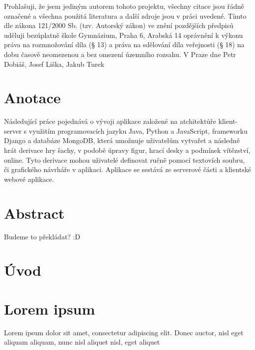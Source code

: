 \documentclass[12pt]{article}
\begin{document}
\graphicspath{{./pictures/}}
\renewcommand*\contentsname{Obsah}
\renewcommand{\bibfont}{\small}
\renewcommand{\thesection}{\Roman{section}} 
\renewcommand{\thesubsection}{\thesection.\Roman{subsection}}
\renewcommand{\thesubsubsection}{\thesubsection.\Roman{subsubsection}}
\renewcommand\listoflistingscaption{Seznam příloh}
\renewcommand{\listingscaption}{Příloha}

\newpage{}
\thispagestyle{empty}
\mbox{}
\vfill
Prohlašuji, že jsem jediným autorem tohoto projektu, všechny citace jsou řádně označené a všechna použitá literatura a další zdroje jsou v práci uvedené. Tímto dle zákona 121/2000 Sb. (tzv. Autorský zákon) ve znění pozdějších předpisů uděluji bezúplatně škole Gymnázium, Praha 6, Arabská 14
oprávnění k výkonu práva na rozmnožování díla (§ 13) a práva na sdělování díla veřejnosti (§ 18) na dobu časově neomezenou a bez omezení územního rozsahu.
\newline
V Praze dne \hfill Petr Dobiáš, Josef Liška, Jakub Turek
\newpage{}
\thispagestyle{empty}
\section*{Anotace}
Následující práce pojednává o vývoji aplikace založené na atchitektůře klient-server s využitím programovacích jazyku Java, Python a JavaScript, frameworku Django a databáze MongoDB, která umožnuje uživatelům vytvařet a následně hrát derivace hry šachy, v podobě úpravy figur, hrací desky a podmínek vítězství, online. Tyto derivace mohou uživatelé definovat ručně pomocí textovích soubru, či grafického návrháře v aplikaci. Aplikace se sestává ze serverové části a klientské webové aplikace.
\section*{Abstract}
Budeme to překládat? :D
\newpage
\setcounter{page}{1}
\tableofcontents 
\newpage
\section*{Úvod}
\newpage
\section*{Lorem ipsum}
Lorem ipsum dolor sit amet, consectetur adipiscing elit. Donec auctor, nisl eget aliquam aliquam, nunc nisl aliquet nisl, eget aliquet
\newpage
\printbibliography[heading=bibintoc,title={Reference}]
\newpage
{}
\listoflistings
\end{document}
